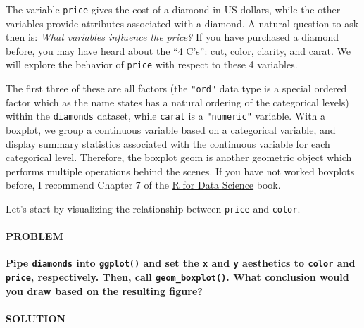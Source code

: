 \documentclass[]{article}
\newenvironment{Shaded}{\begin{snugshade}}{\end{snugshade}}
\newcommand{\DataTypeTok}[1]{\textcolor[rgb]{0.13,0.29,0.53}{#1}}
\newcommand{\KeywordTok}[1]{\textcolor[rgb]{0.13,0.29,0.53}{\textbf{#1}}}
\newcommand{\NormalTok}[1]{#1}
\newcommand{\OperatorTok}[1]{\textcolor[rgb]{0.81,0.36,0.00}{\textbf{#1}}}
\newcommand{\StringTok}[1]{\textcolor[rgb]{0.31,0.60,0.02}{#1}}
\let\oldparagraph\paragraph
\renewcommand{\paragraph}[1]{\oldparagraph{#1}\mbox{}}
\begin{document}
The variable \texttt{price} gives the cost of a diamond in US dollars,
while the other variables provide attributes associated with a diamond.
A natural question to ask then is: \emph{What variables influence the
price?} If you have purchased a diamond before, you may have heard about
the ``4 C's'': cut, color, clarity, and carat. We will explore the
behavior of \texttt{price} with respect to these 4 variables.

The first three of these are all factors (the \texttt{"ord"} data type
is a special ordered factor which as the name states has a natural
ordering of the categorical levels) within the \texttt{diamonds}
dataset, while \texttt{carat} is a \texttt{"numeric"} variable. With a
boxplot, we group a continuous variable based on a categorical variable,
and display summary statistics associated with the continuous variable
for each categorical level. Therefore, the boxplot geom is another
geometric object which performs multiple operations behind the scenes.
If you have not worked boxplots before, I recommend Chapter 7 of the
\href{https://r4ds.had.co.nz/}{R for Data Science} book.

Let's start by visualizing the relationship between \texttt{price} and
\texttt{color}.

\hypertarget{problem-25}{%
\paragraph{PROBLEM}\label{problem-25}}

\textbf{Pipe \texttt{diamonds} into \texttt{ggplot()} and set the
\texttt{x} and \texttt{y} aesthetics to \texttt{color} and
\texttt{price}, respectively. Then, call \texttt{geom\_boxplot()}. What
conclusion would you draw based on the resulting figure?}

\hypertarget{solution-24}{%
\paragraph{SOLUTION}\label{solution-24}}

\begin{Shaded}
\end{Shaded}
\end{document}

